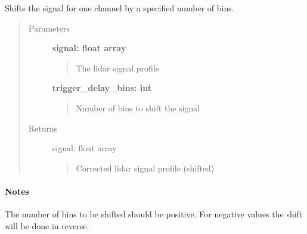 \documentclass[letterpaper,10pt,english]{sphinxmanual}
\begin{document}
\begin{fulllineitems}
\label{pre_processing:pre_processing.correct_trigger_delay_bins}
Shifts the signal for one channel by a specified number of bins.
\begin{quote}\begin{description}
\item[{Parameters}] \leavevmode
\textbf{signal: float array}
\begin{quote}

The lidar signal profile
\end{quote}

\textbf{trigger\_delay\_bins: int}
\begin{quote}

Number of bins to shift the signal
\end{quote}

\item[{Returns}] \leavevmode
signal: float array
\begin{quote}

Corrected lidar signal profile (shifted)
\end{quote}

\end{description}\end{quote}
\paragraph{Notes}

The number of bins to be shifted should be positive. For negative values
the shift will be done in reverse.

\end{fulllineitems}

\end{document}
